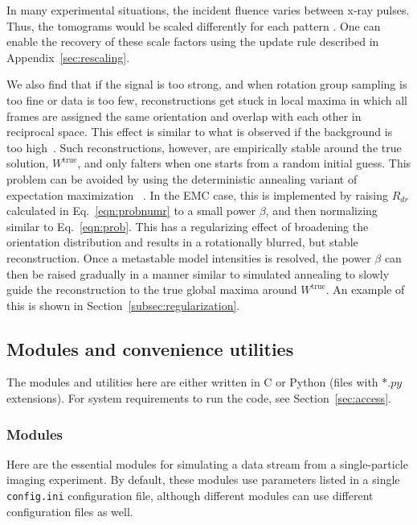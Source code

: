 \documentclass[]{iucr}              %
\begin{document}
In many experimental situations, the incident fluence varies between x-ray pulses. Thus, the tomograms would be scaled differently for each pattern \cite{loh2010,ekeberg2015}. One can enable the recovery of these scale factors using the update rule described in Appendix~\ref{sec:rescaling}. 

We also find that if the signal is too strong, and when rotation group sampling is too fine or data is too few, reconstructions get stuck in local maxima in which all frames are assigned the same orientation and overlap with each other in reciprocal space. This effect is similar to what is observed if the background is too high~\cite{ayyer2015}. Such reconstructions, however, are empirically stable around the true solution, $W^{\text{true}}$, and only falters when one starts from a random initial guess. This problem can be avoided by using the deterministic annealing variant of expectation maximization ~\cite{ueda1998}. In the EMC case, this is implemented by raising $R_{dr}$ calculated in Eq.~\ref{eqn:probnumr} to a small power $\beta$, and then normalizing similar to Eq.~\ref{eqn:prob}. This has a regularizing effect of broadening the orientation distribution and results in a rotationally blurred, but stable reconstruction. Once a metastable model intensities is resolved, the power $\beta$ can then be raised gradually in a manner similar to simulated annealing to slowly guide the reconstruction to the true global maxima around $W^{\text{true}}$. An example of this is shown in Section~\ref{subsec:regularization}.

\subsection{Modules and convenience utilities}\label{subsec:mod+utils}

The modules and utilities here are either written in C or Python (files with $*.py$ extensions). For system requirements to run the code, see Section~\ref{sec:access}.

\subsubsection{Modules}\label{subsubsec:mods}
Here are the essential modules for simulating a data stream from a single-particle imaging experiment. By default, these modules use parameters listed in a single \texttt{config.ini} configuration file, although different modules can use different configuration files as well.
\end{document}
